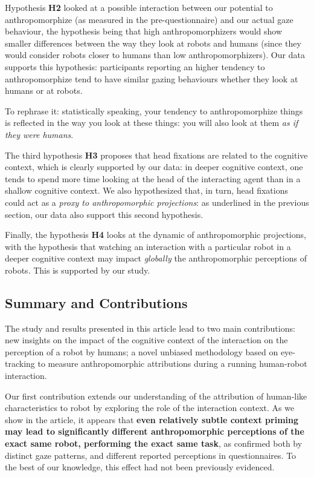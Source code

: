 \documentclass[lettersize, noapacite, twoside, HRI]{apa_HRI}
\newcommand{\h}[1]{\textbf{H#1}\xspace}
\begin{document}
Hypothesis \h{2} looked at a possible interaction between our potential to
anthropomorphize (as measured in the pre-questionnaire) and our actual gaze
behaviour, the hypothesis being that high anthropomorphizers would show smaller
differences between the way they look at robots and humans (since they would
consider robots closer to humans than low anthropomorphizers). Our data supports
this hypothesis: participants reporting an higher tendency to anthropomorphize
tend to have similar gazing behaviours whether they look at humans or at robots.

To rephrase it: statistically speaking, your tendency to anthropomorphize things
is reflected in the way you look at these things: you will also look at them
\emph{as if they were humans}.

The third hypothesis \h{3} proposes that head fixations are related to the
cognitive context, which is clearly supported by our data: in deeper cognitive
context, one tends to spend more time looking at the head of the interacting
agent than in a shallow cognitive context. We also hypothesized that, in turn,
head fixations could act as a \emph{proxy to anthropomorphic projections}: as
underlined in the previous section, our data also support this second
hypothesis.

Finally, the hypothesis \h{4} looks at the dynamic of anthropomorphic
projections, with the hypothesis that watching an interaction with a particular
robot in a deeper cognitive context may impact \emph{globally} the
anthropomorphic perceptions of robots. This is supported by our study.

\subsection{Summary and Contributions}

The study and results presented in this article lead to two main contributions:
new insights on the impact of the cognitive context of the interaction on the
perception of a robot by humans; a novel unbiased methodology based on
eye-tracking to measure anthropomorphic attributions during a running
human-robot interaction.

Our first contribution extends our understanding of the attribution of
human-like characteristics to robot by exploring the role of the interaction
context. As we show in the article, it appears that \textbf{even relatively
subtle context priming may lead to significantly different anthropomorphic
perceptions of the exact same robot, performing the exact same task}, as
confirmed both by distinct gaze patterns, and different reported perceptions in
questionnaires. To the best of our knowledge, this effect had not been previously
evidenced.
\end{document}
